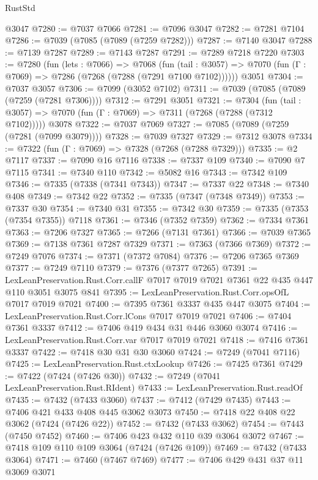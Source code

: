 \begin{lexlean}{RustStd}
\begin{coremodule}
    @3047
@7280 := @7037 @7066
@7281 := @7096 @3047
@7282 := @7281 @7104
@7286 := @7039 (@7085 (@7089 (@7259 @7282)))
@7287 := @7140 @3047
@7288 := @7139 @7287
@7289 := @7143 @7287
@7291 := @7289 @7218 @7220
@7303 := @7280
    (fun (lets : @7066) =>
    @7068
      (fun (tail : @3057) => @7070 (fun (Γ : @7069) => @7286 (@7268 (@7288 (@7291 @7100 @7102))))))
    @3051
@7304 := @7037 @3057
@7306 := @7099 (@3052 @7102)
@7311 := @7039 (@7085 (@7089 (@7259 (@7281 @7306))))
@7312 := @7291 @3051
@7321 := @7304
    (fun (tail : @3057) => @7070 (fun (Γ : @7069) => @7311 (@7268 (@7288 (@7312 @7102)))))
    @3078
@7322 := @7037 @7069
@7327 := @7085 (@7089 (@7259 (@7281 (@7099 @3079))))
@7328 := @7039 @7327
@7329 := @7312 @3078
@7334 := @7322 (fun (Γ : @7069) => @7328 (@7268 (@7288 @7329)))
@7335 := @2 @7117
@7337 := @7090 @16 @7116
@7338 := @7337 @109
@7340 := @7090 @7 @7115
@7341 := @7340 @110
@7342 := @5082 @16
@7343 := @7342 @109
@7346 := @7335 (@7338 (@7341 @7343))
@7347 := @7337 @22
@7348 := @7340 @408
@7349 := @7342 @22
@7352 := @7335 (@7347 (@7348 @7349))
@7353 := @7337 @30
@7354 := @7340 @31
@7355 := @7342 @30
@7359 := @7335 (@7353 (@7354 @7355)) @7118
@7361 := @7346 (@7352 @7359)
@7362 := @7334 @7361
@7363 := @7206 @7327
@7365 := @7266 (@7131 @7361)
@7366 := @7039 @7365
@7369 := @7138 @7361 @7287 @7329
@7371 := @7363 (@7366 @7369)
@7372 := @7249 @7076
@7374 := @7371 (@7372 @7084)
@7376 := @7206 @7365 @7369
@7377 := @7249 @7110
@7379 := @7376 (@7377 @7265)
@7391 := LexLeanPreservation.Rust.Corr.callF
    @7017
    @7019
    @7021
    @7361
    @22
    @435
    @447
    @110
    @3051
    @3075
    @841
@7395 := LexLeanPreservation.Rust.Corr.opsOfL @7017 @7019 @7021
@7400 := @7395 @7361 @3337 @435 @447 @3075
@7404 := LexLeanPreservation.Rust.Corr.lCons @7017 @7019 @7021
@7406 := @7404 @7361 @3337
@7412 := @7406 @419 @434 @31 @446 @3060 @3074
@7416 := LexLeanPreservation.Rust.Corr.var @7017 @7019 @7021
@7418 := @7416 @7361 @3337
@7422 := @7418 @30 @31 @30 @3060
@7424 := @7249 (@7041 @7116)
@7425 := LexLeanPreservation.Rust.ctxLookup
@7426 := @7425 @7361
@7429 := @7422 (@7424 (@7426 @30))
@7432 := @7249 (@7041 LexLeanPreservation.Rust.RIdent)
@7433 := LexLeanPreservation.Rust.readOf
@7435 := @7432 (@7433 @3060)
@7437 := @7412 (@7429 @7435)
@7443 := @7406 @421 @433 @408 @445 @3062 @3073
@7450 := @7418 @22 @408 @22 @3062 (@7424 (@7426 @22))
@7452 := @7432 (@7433 @3062)
@7454 := @7443 (@7450 @7452)
@7460 := @7406 @423 @432 @110 @39 @3064 @3072
@7467 := @7418 @109 @110 @109 @3064 (@7424 (@7426 @109))
@7469 := @7432 (@7433 @3064)
@7471 := @7460 (@7467 @7469)
@7477 := @7406 @429 @431 @37 @11 @3069 @3071

\end{coremodule}
\end{lexlean}
